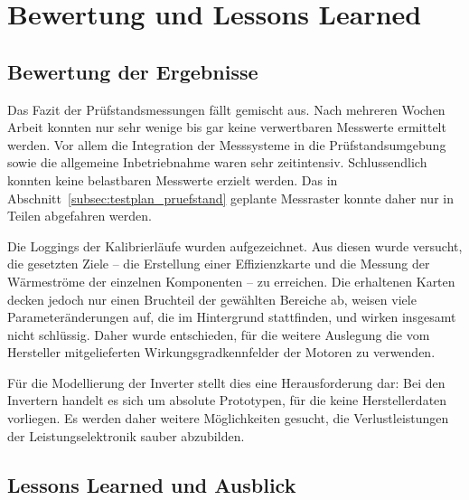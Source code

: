  
\section{Bewertung und Lessons Learned}
\label{sec:fazit_pruefstand}
 

\subsection{Bewertung der Ergebnisse}
\label{subsec:bewertung_pruefstand}

Das Fazit der Prüfstandsmessungen fällt gemischt aus. Nach mehreren Wochen Arbeit konnten nur sehr wenige bis gar keine verwertbaren Messwerte ermittelt werden. Vor allem die Integration der Messsysteme in die Prüfstandsumgebung sowie die allgemeine Inbetriebnahme waren sehr zeitintensiv. Schlussendlich konnten keine belastbaren Messwerte erzielt werden. Das in Abschnitt~\ref{subsec:testplan_pruefstand} geplante Messraster konnte daher nur in Teilen abgefahren werden.

Die Loggings der Kalibrierläufe wurden aufgezeichnet. Aus diesen wurde versucht, die gesetzten Ziele -- die Erstellung einer Effizienzkarte und die Messung der Wärmeströme der einzelnen Komponenten -- zu erreichen. Die erhaltenen Karten decken jedoch nur einen Bruchteil der gewählten Bereiche ab, weisen viele Parameteränderungen auf, die im Hintergrund stattfinden, und wirken insgesamt nicht schlüssig. Daher wurde entschieden, für die weitere Auslegung die vom Hersteller mitgelieferten Wirkungsgradkennfelder der Motoren zu verwenden.

Für die Modellierung der Inverter stellt dies eine Herausforderung dar: Bei den Invertern handelt es sich um absolute Prototypen, für die keine Herstellerdaten vorliegen. Es werden daher weitere Möglichkeiten gesucht, die Verlustleistungen der Leistungselektronik sauber abzubilden.

\subsection{Lessons Learned und Ausblick}
\label{subsec:ausblick_pruefstand}


